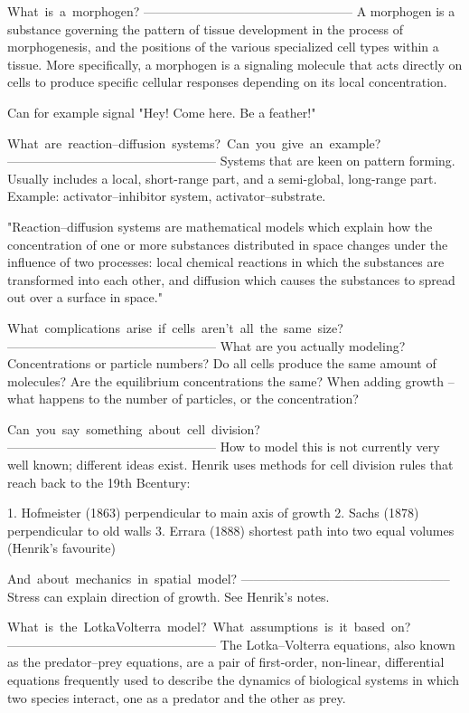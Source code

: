 What is a morphogen?
--------------------------------------------------
A morphogen is a substance governing the pattern of tissue development in the
process of morphogenesis, and the positions of the various specialized cell
types within a tissue. More specifically, a morphogen is a signaling molecule
that acts directly on cells to produce specific cellular responses depending on
its local concentration.

Can for example signal "Hey! Come here. Be a feather!"

What are reaction--diffusion systems? Can you give an example?
--------------------------------------------------
Systems that are keen on pattern forming. Usually includes a local, short-range part,
and a semi-global, long-range part. Example: activator--inhibitor system,
activator--substrate.

"Reaction–diffusion systems are mathematical models which explain how the
concentration of one or more substances distributed in space changes under the
influence of two processes: local chemical reactions in which the substances are
transformed into each other, and diffusion which causes the substances to spread
out over a surface in space."

What complications arise if cells aren’t all the same size?
--------------------------------------------------
What are you actually modeling? Concentrations or particle numbers? 
Do all cells produce the same amount of molecules? Are the equilibrium
concentrations the same? When adding growth -- what happens to the number of
particles, or the concentration?  

Can you say something about cell division?
--------------------------------------------------
How to model this is not currently very well known; different ideas exist.
Henrik uses methods for cell division rules that reach back to the 19th 
Bcentury:   

1. Hofmeister (1863) perpendicular to main axis of growth
2. Sachs (1878) perpendicular to old walls
3. Errara (1888) shortest path into two equal volumes (Henrik's favourite) 

And about mechanics in spatial model?
--------------------------------------------------
Stress can explain direction of growth. See Henrik's notes.  

What is the Lotka­Volterra model? What assumptions is it based on?
--------------------------------------------------
The Lotka–Volterra equations, also known as the predator–prey equations, are a pair of 
first-order, non-linear, differential equations frequently used to describe the dynamics 
of biological systems in which two species interact, one as a predator and the other as prey.

